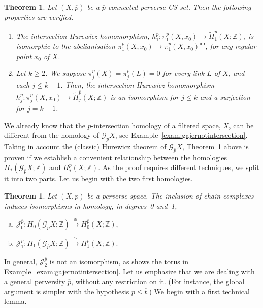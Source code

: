 \documentclass[a4paper,10pt,english,reqno]{amsart}
\theoremstyle{plain}
\newtheorem{theoremb}[proposition]{Theorem}
\theoremstyle{definition}
\theoremstyle{remark}
\numberwithin{equation}{section}
\newcommand{\thmref}[1]{Theorem~\ref{#1}}
\newcommand{\exemref}[1]{Example~\ref{#1}}
\def\ov{\overline}
\def\cJ{{\mathcal J}}
\def\crG{{\mathscr G}}
\def\Z{\mathbb{Z}}
\def\ab{{\mathrm{ab}}}
\renewcommand\1{\hbox{\ding{192}}}
\renewcommand\2{\hbox{\ding{193}}}
\newcommand\3{\hbox{\ding{194}}}
\newcommand\4{\hbox{\ding{195}}}
\begin{document}
\begin{theoremb}\label{thm:hurintersection}
Let $(X,\ov p)$ be a $\ov{p}$-connected perverse CS set. 
Then the following properties are verified.
\begin{enumerate}[1)]
\item The intersection Hurewicz homomorphism, 
$h_{1}^{\ov{p}}\colon \pi_{1}^{\ov{p}}(X,x_{0})\to \widetilde{H}_{1}^{\ov{p}}(X;\Z)$, 
is isomorphic to the abelianisation $\pi_{1}^{\ov{p}}(X,x_{0})\to \pi_{1}^{\ov{p}}(X,x_{0})^{\ab}$,
 for any regular point $x_{0}$ of $X$.
%
%
 \item Let $k\geq 2$. We suppose  
$\pi_{j}^{\ov{p}}(X)=\pi_{j}^{\ov p}(L)=0$ for every link  $L$ of $X$, and each $j\leq k-1$.
Then, the intersection Hurewicz homomorphism
$h_{j}^{\ov{p}}\colon \pi_{j}^{\ov{p}}(X,x_{0})\to \widetilde{H}_{j}^{\ov{p}}(X;\Z)$
 is an isomorphism for $j\leq k$ and a surjection for $j=k+1$.
%
\end{enumerate}
\end{theoremb}



We already know that the $\ov{p}$-intersection homology of a filtered space, $X$, 
can be different from  the homology of $\crG_{\ov{p}}X$, see \exemref{exam:gajernotintersection}.
Taking in account the (classic) Hurewicz  theorem of $\crG_{\ov{p}}X$, \thmref{thm:hurintersection} above is proven 
if we establish 
a convenient relationship between the homologies  $H_{*}(\crG_{\ov{p}}X;\Z)$ and $H_{*}^{\ov{p}}(X;\Z)$.
%
As the proof requires different techniques, we split it into two parts. 
Let us begin with the two first homologies.


\begin{theoremb}\label{InterHomolGajer01}
Let $(X,\ov p)$ be a   perverse space.  The  inclusion of  chain complexes induces
isomorphisms in homology,  in degrees~0 and~1, 
%
\begin{enumerate}[(a)] 
\item $
\cJ_{0}^{\ov{p}} \colon H_0 (\crG_{\ov{p}}X;\Z)\stackrel{\cong}{\longrightarrow} H_0^{\ov p}(X;\Z),
$
\item $
\cJ_{1}^{\ov{p}} \colon H_1 (\crG_{\ov{p}}X;\Z)\stackrel{\cong}{\longrightarrow} H_1^{\ov p}(X;\Z).
$
\end{enumerate}
\end{theoremb}

In general, $\cJ_{2}^{\ov{p}}$ is not an isomorphism, as shows the torus in \exemref{exam:gajernotintersection}.
%
Let us emphasize that we are dealing with a general perversity $\ov{p}$, without any restriction on it. 
(For instance, the global argument is simpler with the hypothesis $\ov{p}\leq \ov{t}$.) 
We begin with a first technical lemma. 
  
\end{document}
